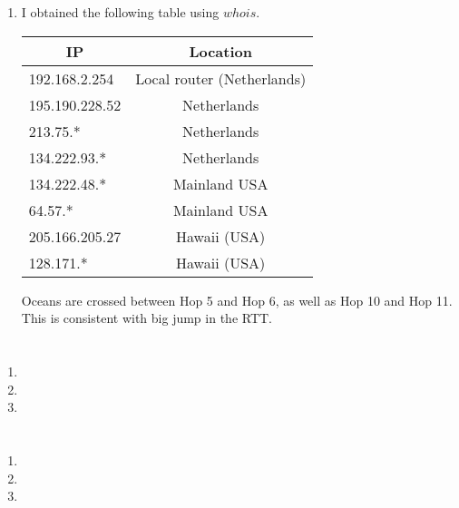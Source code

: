 \documentclass[12pt, a4paper]{article}
\begin{document}
\begin{enumerate}[a]
	\item %
	\begin{multicols}{2}
		I obtained the following table using $whois$.

		\begin{tabular}{l|c}
		\multicolumn{1}{c|}{IP} & Location\\\hline
		192.168.2.254 & Local router (Netherlands)\\
		195.190.228.52 & Netherlands\\
		213.75.* & Netherlands\\
		134.222.93.* & Netherlands\\
		134.222.48.* & Mainland USA\\
		64.57.* & Mainland USA\\
		205.166.205.27 & Hawaii (USA)\\
		128.171.* & Hawaii (USA)
		\end{tabular}

		Oceans are crossed between Hop 5 and Hop 6, as well as Hop 10 and Hop 11. This is consistent with big jump in the RTT.
	\end{multicols}
\end{enumerate}

\section{} %
\begin{enumerate}[a]
	\item %
	\item %
	\item %
\end{enumerate}

\section{} %
\begin{enumerate}[a]
	\item %
	\item %
	\item %
\end{enumerate}
\end{document}
